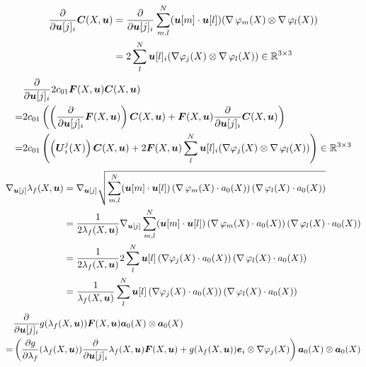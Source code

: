 \begin{align*}
	\d{}{\vu[j]_i}\vC(X,\vu) &= \d{}{\vu[j]_i}\suml{m,l}{N} (\vu[m] \cdot \vu[l])(\divergence\varphi_m(X) \otimes \divergence\varphi_l(X))\\
	&= 2\suml{l}{N} \vu[l]_i(\dpj \otimes \divergence\varphi_l(X))\in\R^{3\times 3}
\end{align*}
\begin{align*}
	&\d{}{\vu[j]_i}2c_{01}\vF(X,\vu)\vC(X,\vu)\\
	=& 2c_{01}\left(\left(\d{}{\vu[j]_i}\vF(X,\vu)\right)\vC(X,\vu) + \vF(X,\vu)\d{}{\vu[j]_i}\vC(X,\vu)\right)\\
	=& 2c_{01}\left(\left(\vU^j_i(X)\right)\vC(X,\vu)
	+ 2\vF(X,\vu)\suml{l}{N} \vu[l]_i(\dpj \otimes \divergence\varphi_l(X))\right)\in\R^{3\times 3}
\end{align*}
\begin{align*}
	\nabla_{\vu[j]}\lambda_f(X,\vu) &= \nabla_{\vu[j]}\sqrt{\suml{m,l}{N} (\vu[m] \cdot \vu[l])\left(\divergence\varphi_m(X)\cdot a_0(X)\right)(\divergence\varphi_l(X)\cdot a_0(X))}\\
	&= \frac{1}{2\lambda_f(X,\vu)} \nabla_{\vu[j]}\suml{m,l}{N} (\vu[m] \cdot \vu[l])\left(\divergence\varphi_m(X)\cdot a_0(X)\right)(\divergence\varphi_l(X)\cdot a_0(X))\\
	&= \frac{1}{2\lambda_f(X,\vu)} 2\suml{l}{N} \vu[l]\left(\dpj\cdot a_0(X)\right)(\divergence\varphi_l(X)\cdot a_0(X))\\
	&= \frac{1}{\lambda_f(X,\vu)} \suml{l}{N} \vu[l]\left(\dpj\cdot a_0(X)\right)(\divergence\varphi_l(X)\cdot a_0(X))
\end{align*}
\begin{align*}
	  & \d{}{\vu[j]_i} g(\lambda_f(X,\vu))\vF(X,\vu)\va_0(X)\otimes\va_0(X)\\
	 =& \left( \d{g}{\lambda_f}(\lambda_f(X,\vu))\d{}{\vu[j]_i}\lambda_f(X,\vu)\vF(X,\vu) + g(\lambda_f(X,\vu))\ve_i\otimes\dpj\right)\va_0(X)\otimes\va_0(X) 
\end{align*}
